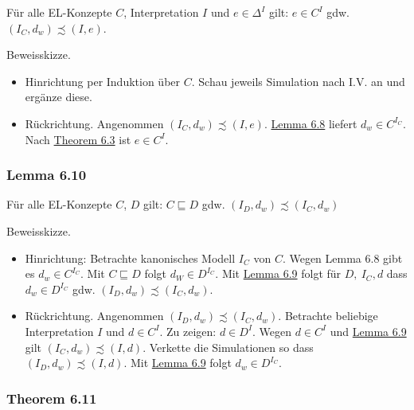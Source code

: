 Für alle EL-Konzepte $C$, Interpretation $I$ und
$e \in \Delta^{I}$ gilt: $e \in C^{I}$ gdw.
$\left( I_{C},d_{w} \right) \precsim \left( I,e \right)$.

Beweisskizze.

\begin{itemize}
\item
  Hinrichtung per Induktion über $C$. Schau jeweils Simulation nach
  I.V. an und ergänze diese.
\item
  Rückrichtung. Angenommen
  $\left( I_{C},d_{w} \right) \precsim \left( I,e \right)$.
  \protect\hyperlink{lemma-6.8}{Lemma 6.8} liefert
  $d_{w} \in C^{I_{C}}$. Nach \protect\hyperlink{lemma-6.3}{Theorem
  6.3} ist $e \in C^{I}$.
\end{itemize}

\subsubsection{Lemma 6.10}\label{lemma-6.10}

Für alle EL-Konzepte $C$, $D$ gilt: $C \sqsubseteq D$ gdw.
$\left( I_{D},d_{w} \right) \precsim \left( I_{C},d_{w} \right)$

Beweisskizze.

\begin{itemize}
\item
  Hinrichtung: Betrachte kanonisches Modell $I_{C}$ von $C$. Wegen
  Lemma 6.8 gibt es $d_{w} \in C^{I_{C}}$. Mit $C \sqsubseteq D$
  folgt $d_{W} \in D^{I_{C}}$. Mit \protect\hyperlink{lemma-6.9}{Lemma
  6.9} folgt für $D,\ I_{C},d$ dass $d_{w} \in D^{I_{C}}$ gdw.
  $\left( I_{D},d_{w} \right) \precsim \left( I_{C},d_{w} \right)$.
\item
  Rückrichtung. Angenommen
  $\left( I_{D},d_{w} \right) \precsim \left( I_{C},d_{w} \right)$.
  Betrachte beliebige Interpretation $I$ und $d \in C^{I}$. Zu
  zeigen: $d \in D^{I}$. Wegen $d \in C^{I}$ und
  \protect\hyperlink{lemma-6.9}{Lemma 6.9} gilt
  $\left( I_{C},d_{w} \right) \precsim \left( I,d \right)$. Verkette
  die Simulationen so dass
  $\left( I_{D},d_{w} \right) \precsim \left( I,d \right)$. Mit
  \protect\hyperlink{lemma-6.9}{Lemma 6.9} folgt
  $d_{w} \in D^{I_{C}}$.
\end{itemize}

\subsubsection{Theorem 6.11}\label{theorem-6.11}

